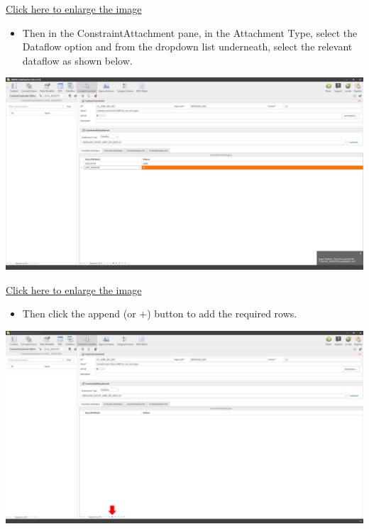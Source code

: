 \documentclass[
]{book}
\providecommand{\tightlist}{%
  \setlength{\itemsep}{0pt}\setlength{\parskip}{0pt}}
\begin{document}
\href{images/image272.png}{Click here to enlarge the image}

\begin{itemize}
\tightlist
\item
  Then in the ConstraintAttachment pane, in the Attachment Type, select the Dataflow option and from the dropdown list underneath, select the relevant dataflow as shown below.
\end{itemize}

\begin{center}\includegraphics[width=1\linewidth]{./images/image273} \end{center}

\href{images/image273.png}{Click here to enlarge the image}

\begin{itemize}
\tightlist
\item
  Then click the append (or +) button to add the required rows.
\end{itemize}

\begin{center}\includegraphics[width=1\linewidth]{./images/image274} \end{center}
\end{document}

